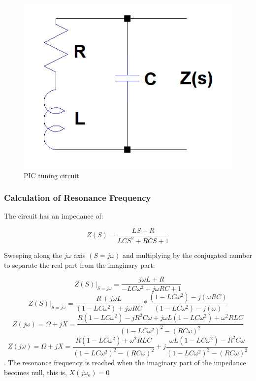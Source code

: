 \documentclass[a4paper, 10pt, conference]{ieeeconf}      %
\begin{document}
\begin{figure}[H]
\centering
\includegraphics[scale=0.25]{Images/ImagenesTesina/antena/Antena_Equivalente.png}
\caption{PIC tuning circuit}
\label{fig:antena_eq}
\end{figure}

\subsubsection{Calculation of Resonance Frequency}



The circuit has an impedance of:

\begin{equation}
Z(S) = \frac{LS + R}{LCS^2 + RCS + 1}
\end{equation}

%
%
Sweeping along the  $j\omega$ axis $(S = j\omega)$ and multiplying by the conjugated number to separate the real part from the imaginary part: 

{\tiny{
$$ Z(S)|_{S=j\omega} = \frac{j\omega L + R}{-LC\omega ^2 + j\omega RC + 1}$$
$$Z(S)|_{S=j\omega} = \frac{R + j\omega L}{(1 - LC\omega^2) + j\omega RC} * \frac{(1 - LC\omega ^2) - j(\omega RC)}{(1 - LC\omega ^2) - j(\omega)}$$
$$Z(j\omega) = \Omega + jX = \frac{R(1 - LC\omega ^2)-jR^2C\omega+j\omega L(1-LC\omega ^2)+\omega ^2 RLC}{(1 - LC\omega ^2)^2 - (RC\omega )^2}$$
$$Z(j\omega) = \Omega + jX = \frac{R(1 - LC\omega ^2)+\omega ^2RLC}{(1 - LC\omega ^2)^2 - (RC\omega )^2}+j\frac{\omega L(1 - LC\omega ^2)-R^2C\omega}{(1 - LC\omega ^2)^2 - (RC\omega )^2}$$
.}}
The resonance frequency is reached when the imaginary part of the impedance becomes null, this is, $X(j\omega _o) = 0$
\end{document}
